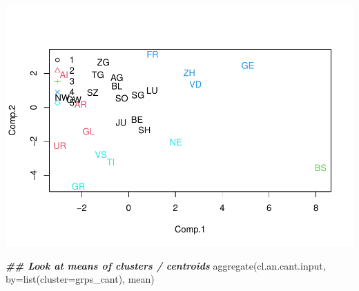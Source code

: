 \documentclass[
]{article}
\newenvironment{Shaded}{\begin{snugshade}}{\end{snugshade}}
\newcommand{\AttributeTok}[1]{\textcolor[rgb]{0.77,0.63,0.00}{#1}}
\newcommand{\DocumentationTok}[1]{\textcolor[rgb]{0.56,0.35,0.01}{\textbf{\textit{#1}}}}
\newcommand{\FunctionTok}[1]{\textcolor[rgb]{0.00,0.00,0.00}{#1}}
\newcommand{\NormalTok}[1]{#1}
\begin{document}
\includegraphics{Influence_factors_files/figure-latex/3.19_aggl_clust2_cant-1.pdf}

\begin{Shaded}
\begin{Highlighting}[]
\DocumentationTok{\#\# Look at means of clusters / centroids}
\FunctionTok{aggregate}\NormalTok{(cl.an.cant.input, }\AttributeTok{by=}\FunctionTok{list}\NormalTok{(}\AttributeTok{cluster=}\NormalTok{grps\_cant), mean)}
\end{Highlighting}
\end{Shaded}
\end{document}
